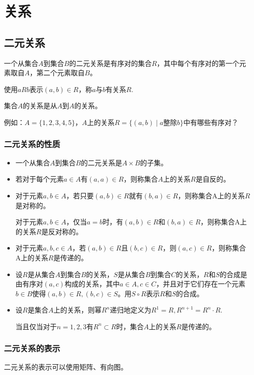 \section{关系}
\subsection{二元关系}
一个从集合$A$到集合$B$的二元关系是有序对的集合$R$，其中每个有序对的第一个元素取自$A$，第二个元素取自$B$。

使用$aRb$表示$(a,b) \in R$，称$a$与$b$有关系$R$.

集合$A$的关系是从$A$到$A$的关系。

例如：$A = \{ 1,2,3,4,5 \}$，$A$上的关系$R=\{ (a,b) \mid a \text{整除} b \}$中有哪些有序对？

\subsubsection*{二元关系的性质}
\begin{itemize}
    \item 一个从集合$A$到集合$B$的二元关系是$A \times B$的子集。
    
    \item 若对于每个元素$a \in A$有$(a,a) \in R$，则称集合$A$上的关系$R$是自反的。
    
    \item 对于元素$a,b \in A$，若只要$(a, b) \in R$就有$(b,a) \in R$，则称集合A上的关系$R$是对称的。

    对于元素$a,b \in A$，仅当$a = b$时，有$(a,b) \in R$和$(b,a) \in R$，则称集合A上的关系$R$是反对称的。

    \item 对于元素$a,b,c \in A$，若$(a, b) \in R$且$(b,c) \in R$，则$(a,c) \in R$，则称集合A上的关系$R$是传递的。

    \item 设$R$是从集合$A$到集合$B$的关系，$S$是从集合$B$到集合$C$的关系，$R$和$S$的合成是由有序对$(a,c)$构成的关系，其中$a \in A, c \in C$，并且对于它们存在一个元素$b \in B$使得$(a,b) \in R, (b,c) \in S$。用$S \circ R$表示$R$和$S$的合成。

    \item 设$R$是集合$A$上的关系，则幂$R^n$递归地定义为$R^1 = R, R^{n+1} = R^n \cdot R$.

    当且仅当对于$n=1,2,3$有$R^n \subset R$时，集合$A$上的关系$R$是传递的。
\end{itemize}

\subsubsection*{二元关系的表示}
二元关系的表示可以使用矩阵、有向图。

